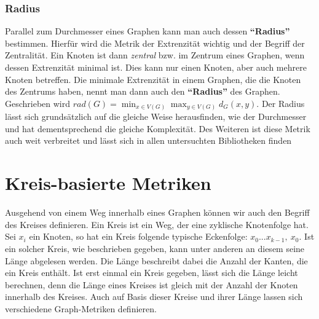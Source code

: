 \documentclass[a4paper,12pt,ngerman,chapterprefix=false,listof=totoc,bibliography=totoc]{scrreprt}
\begin{document}
\subsubsection*{Radius}
{
Parallel zum Durchmesser eines Graphen kann man auch dessen \textbf{"`Radius"'} bestimmen. Hierfür wird die Metrik der Extrenzität wichtig und der Begriff der Zentralität. Ein Knoten ist dann \textit{zentral} bzw. im Zentrum eines Graphen, wenn dessen Extrenzität minimal ist. Dies kann nur einen Knoten, aber auch mehrere Knoten betreffen. Die minimale Extrenzität in einem Graphen, die die Knoten des Zentrums haben, nennt man dann auch den \textbf{"`Radius"'} des Graphen. Geschrieben wird \(rad(G) = \min_{x\in V(G)}\max_{y\in V(G)}d_G(x,y)\). \cite{diestel_graphentheorie_2000} Der Radius lässt sich grundsätzlich auf die gleiche Weise herausfinden, wie der Durchmesser und hat dementsprechend die gleiche Komplexität. Des Weiteren ist diese Metrik auch weit verbreitet und lässt sich in allen untersuchten Bibliotheken finden \cite{sagemath_graph_2020,wolfram_graph_2020,matlab_shortest_2020}
}
\section{Kreis-basierte Metriken}
{
Ausgehend von einem Weg innerhalb eines Graphen können wir auch den Begriff des Kreises definieren. Ein Kreis ist ein Weg, der eine zyklische Knotenfolge hat. Sei \(x_i\) ein Knoten, so hat ein Kreis folgende typische Eckenfolge: \(x_0...x_{k-1},\ x_0\). Ist ein solcher Kreis, wie beschrieben gegeben, kann unter anderen an diesem seine Länge abgelesen werden. Die Länge beschreibt dabei die Anzahl der Kanten, die ein Kreis enthält. Ist erst einmal ein Kreis gegeben, lässt sich die Länge leicht berechnen, denn die Länge eines Kreises ist gleich mit der Anzahl der Knoten innerhalb des Kreises. \cite{diestel_graphentheorie_2000} Auch auf Basis dieser Kreise und ihrer Länge lassen sich verschiedene Graph-Metriken definieren.
}
\end{document}
